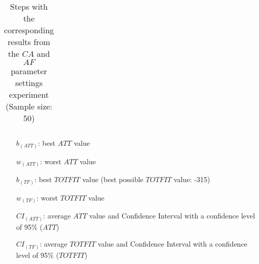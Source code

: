 \begin{sidewaystable}
\begin{tabular}{|l|l|l||c|c|c|c|c|c|}
    \hline
    \end{tabular}
    \caption {Steps with the corresponding results from the $CA$ and $AF$ parameter settings experiment (Sample size: 50)}
    \tiny
    \begin{itemize}[noitemsep]
    \item[$b_{(ATT)}$:] best $ATT$ value
    \item[$w_{(ATT)}$:] worst $ATT$ value
    \item[$b_{(TF)}$:] best $TOTFIT$ value (best possible $TOTFIT$ value: -315)
    \item[$w_{(TF)}$:] worst $TOTFIT$ value
    \item[$CI_{(ATT)}$:] average $ATT$ value and Confidence Interval with a confidence level of 95\% ($ATT$)
    \item[$CI_{(TF)}$:] average $TOTFIT$ value and Confidence Interval with a confidence level of 95\% ($TOTFIT$)
    \end{itemize}
    \label{table:pm2}
\end{sidewaystable}



